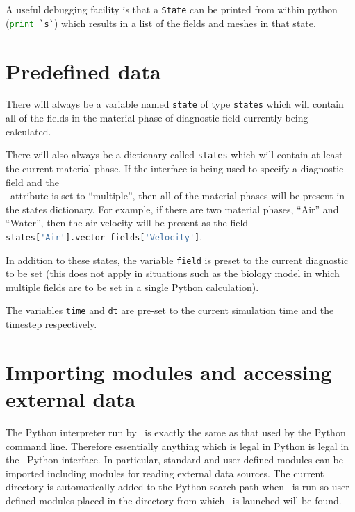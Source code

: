 A useful debugging facility is that a \lstinline[language=Python]+State+ can
be printed from within python (\lstinline[language=Python]+print `s`+) which
results in a list of the fields and meshes in that state.

\section{Predefined data}

 There will always be a variable named
\lstinline[language=Python]+state+ of type
\lstinline[language=Python]+states+ which will contain all of the fields in
the material phase of diagnostic field currently being calculated.

There will also always be a dictionary called \lstinline[language=Python]+states+
which will contain at least the current material phase. If the interface is
being used to specify a diagnostic field and the\\
\ attribute is set to
``multiple'', then all of the material phases will be present in the
states dictionary. For example, if there are two material phases, ``Air''
and ``Water'', then the air velocity will be present as the field\\
\lstinline[language=Python]+states['Air'].vector_fields['Velocity']+.

In addition to these states, the variable \lstinline[language=Python]+field+
is preset to the current diagnostic to be set (this does not apply in
situations such as the biology model in which multiple fields are to be set
in a single Python calculation).

The variables \lstinline[language=Python]+time+ and
\lstinline[language=Python]+dt+ are pre-set to the current simulation time
and the timestep respectively.

\section{Importing modules and accessing external data}

The Python interpreter run by \fluidity\ is exactly the same as that used by
the Python command line. Therefore essentially anything which is legal in
Python is legal in the \fluidity\ Python interface. In particular, standard
and user-defined modules can be imported including modules for reading
external data sources. The current directory is automatically added to the
Python search path when \fluidity\ is run so user defined modules placed in
the directory from which \fluidity\ is launched will be found.

